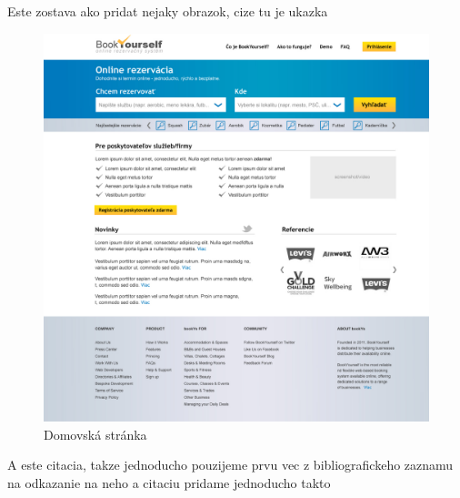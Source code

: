 Este zostava ako pridat nejaky obrazok, cize tu je ukazka

\begin{figure}[h]
	\centering	
		\includegraphics[scale=0.25]{images/homepage.jpg} %
		\caption{Domovská stránka}                        %
		\label{img:homepage}                              %
\end{figure}

A este citacia, takze jednoducho pouzijeme prvu vec z bibliografickeho zaznamu na odkazanie na neho a citaciu pridame jednoducho takto
\cite{alertbox}
